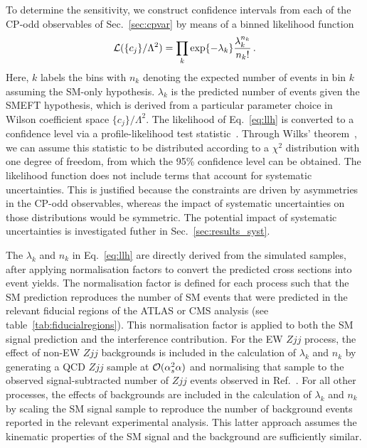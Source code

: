 \documentclass[twocolumn,preprintnumbers,superscriptaddress,nofootinbib,aps,prd,floatfix]{revtex4}
\begin{document}
To determine the sensitivity, we construct confidence intervals from each of the CP-odd observables of Sec.~\ref{sec:cpvar} by means of a binned likelihood function 
\begin{equation}
\label{eq:llh}
 {\cal{L}}(\{c_j\}/\Lambda^2) =  \prod_{k} \exp\{-\lambda_k\} \frac{\lambda_k^{n_k}}{n_k!} \,.
\end{equation}
Here, $k$ labels the bins with $n_k$ denoting the expected number of events in bin $k$ assuming the SM-only hypothesis. $\lambda_k$ is the predicted number of events given the SMEFT hypothesis, which is derived from a particular parameter choice in Wilson coefficient space $\{c_j\}/\Lambda^2$. The likelihood of Eq.~\eqref{eq:llh} is converted to a confidence level via a profile-likelihood test statistic~\cite{Feldman:1997qc}. Through Wilks' theorem~\cite{wilks1938}, we can assume this statistic to be distributed according to a $\chi^2$ distribution with one degree of freedom, from which the 95\% confidence level can be obtained. The likelihood function does not include terms that account for systematic uncertainties. This is justified because the constraints are driven by asymmetries in the CP-odd observables, whereas the impact of systematic uncertainties on those distributions would be symmetric. The potential impact of systematic uncertainties is investigated futher in Sec.~\ref{sec:results_syst}.


The $\lambda_k$ and $n_k$ in Eq.~\eqref{eq:llh} are directly derived from the simulated samples, after applying normalisation factors to convert the predicted cross sections into event yields. The normalisation factor is defined for each process such that the SM prediction reproduces the number of SM events that were predicted in the relevant fiducial regions of the ATLAS or CMS analysis (see table~\ref{tab:fiducialregions}). This normalisation factor is applied to both the SM signal prediction and the interference contribution. For the EW $Zjj$ process, the effect of non-EW $Zjj$ backgrounds is included in the calculation of $\lambda_k$ and $n_k$ by generating a QCD $Zjj$ sample 
at ${\cal{O}}(\alpha_s^2 \alpha)$ and normalising that sample to the observed signal-subtracted number of $Zjj$ events observed in Ref.~\cite{ATLAS:2020nzk}. For all other processes, the effects of backgrounds are included in the calculation of $\lambda_k$ and $n_k$ by scaling the SM signal sample to reproduce the number of background events reported in the relevant experimental analysis. This latter approach assumes the kinematic properties of the SM signal and the background are sufficiently similar.
\end{document}
